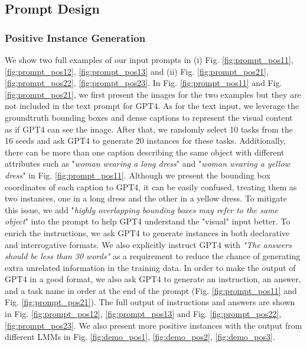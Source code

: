 \subsection{Prompt Design}
\subsubsection{Positive Instance Generation}
We show two full examples of our input prompts in (i) Fig. \ref{fig:prompt_pos11}, \ref{fig:prompt_pos12}, \ref{fig:prompt_pos13} and (ii) Fig. \ref{fig:prompt_pos21}, \ref{fig:prompt_pos22}, \ref{fig:prompt_pos23}. In Fig. \ref{fig:prompt_pos11} and Fig. \ref{fig:prompt_pos21}, we first present the images for the two examples but they are not included in the text prompt for GPT4. As for the text input, we leverage the groundtruth bounding boxes and dense captions to represent the visual content as if GPT4 can see the image. After that, we randomly select 10 tasks from the 16 seeds and ask GPT4 to generate 20 instances for these tasks. Additionally, there can be more than one caption describing the same object with different attributes such as "\textit{woman wearing a long dress}" and "\textit{woman wearing a yellow dress}" in Fig. \ref{fig:prompt_pos11}. Although we present the bounding box coordinates of each caption to GPT4, it can be easily confused, treating them as two instances, one in a long dress and the other in a yellow dress. To mitigate this issue, we add "\textit{highly overlapping bounding boxes may refer to the same object}" into the prompt to help GPT4 understand the "visual" input better. To enrich the instructions, we ask GPT4 to generate instances in both declarative and interrogative formats. We also explicitly instruct GPT4 with \textit{"The answers should be less than 30 words"} as a requirement to reduce the chance of generating extra unrelated information in the training data. In order to make the output of GPT4 in a good format, we also ask GPT4 to generate an instruction, an answer, and a task name in order at the end of the prompt (Fig. \ref{fig:prompt_pos11} and Fig. \ref{fig:prompt_pos21}). The full output of instructions and answers are shown in Fig. \ref{fig:prompt_pos12}, \ref{fig:prompt_pos13} and Fig. \ref{fig:prompt_pos22}, \ref{fig:prompt_pos23}. We also present more positive instances with the output from different LMMs in Fig. \ref{fig:demo_pos1}, \ref{fig:demo_pos2}, \ref{fig:demo_pos3}.




